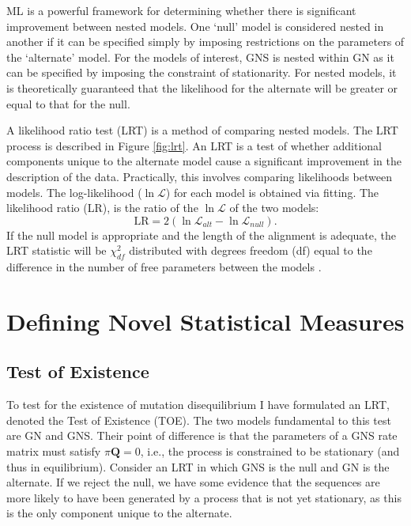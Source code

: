 ML is a powerful framework for determining whether there is significant improvement between \gls{nested} models. One `null' model is considered nested in another if it can be specified simply by imposing restrictions on the parameters of the `alternate' model.  For the models of interest, GNS is nested within GN as it can be specified by imposing the constraint of stationarity. For nested models, it is theoretically guaranteed that the likelihood for the alternate will be greater or equal to that for the null. 

A likelihood ratio test (LRT) is a method of comparing nested models. The LRT process is described in Figure \ref{fig:lrt}. An LRT is a test of whether additional components unique to the alternate model cause a significant improvement in the description of the data. Practically, this involves comparing likelihoods between models. The log-likelihood ($\ln\mathcal{L}$) for each model is obtained via fitting. The likelihood ratio (LR), is the ratio of the $\ln\mathcal{L}$ of the two models:
$$\mathrm{LR} = 2(\ln \mathcal{L}_{alt} -  \ln \mathcal{L}_{null}).$$
If the null model is appropriate and the length of the alignment is adequate, the LRT statistic will be $\chi^2_{df}$ distributed with degrees freedom (df) equal to the difference in the number of free parameters between the models \citep{Lindgren1993StatisticalTheory, Silvey1975StatisticalInference, Kendall1979The2}.



\section{Defining Novel Statistical Measures}
\label{Novel Statistical}

\subsection{Test of Existence}
\label{Test of Existence}

To test for the existence of mutation disequilibrium I have formulated an LRT, denoted the Test of Existence (TOE). The two models fundamental to this test are GN and GNS. Their point of difference is that the parameters of a GNS rate matrix must satisfy $\pi\mathbf{Q}=0$, i.e., the process is constrained to be stationary (and thus in equilibrium). Consider an LRT in which GNS is the null and GN is the alternate. If we reject the null, we have some evidence that the sequences are more likely to have been generated by a process that is not yet stationary, as this is the only component unique to the alternate.

